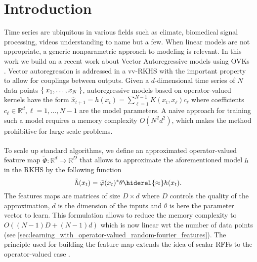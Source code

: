 

\section{Introduction}
Time series are ubiquitous in various fields such as climate, biomedical signal
processing, videos understanding to name but a few. When linear models are not
appropriate, a generic nonparametric approach to modeling is relevant. In this
work we build on a recent work about Vector Autoregressive models using
\aclp{OVK} \cite{Lim2013,Lim2015}. Vector autoregression is
addressed in a \acl{vv-RKHS} with the important property to allow for couplings
between outputs. Given a $d$-dimensional time series of $N$ data points
$\Set{x_1,\dots, x_N}$, autoregressive models based on operator-valued kernels
have the form $\hat{x}_{t+1}=h(x_t)=\sum_{\ell=1}^{N-1}K(x_t,x_\ell){c}_\ell$
where coefficients ${c}_\ell\in\mathbb{R}^d, \ell=1,\dots,N-1$ are the model
parameters. A naive approach for training such a model requires a memory
complexity $O(N^2d^2)$, which makes the method prohibitive for large-scale
problems.
\paragraph{}
To scale up standard algorithms, we define an approximated operator-valued
feature map $\tilde{\Phi}:\mathbb{R}^d\to\mathbb{R}^D$ that allows to
approximate the aforementioned model $h$ in the \ac{RKHS} by the following
function 
\begin{dmath*}
    \tilde{h}(x_t) = \tilde{\Phi}(x_t)^*\theta \hiderel{\approx} h(x_t).
\end{dmath*}
The features maps are matrices of size $D\times  d$ where $D$ controls the
quality of the approximation, $d$ is the dimension of the inputs and $\theta$
is here the parameter vector to learn. This formulation allows to reduce the
memory complexity to $O((N-1)D + (N-1)d)$ which is now linear \acs{wrt} the
number of data points
(see \cref{sec:learning_with_operator-valued_random-fourier_features}). The
principle used for building the feature map extends the idea of scalar
\aclp{RFF} to the operator-valued case \citep{Rahimi2007,sutherland2015}.

